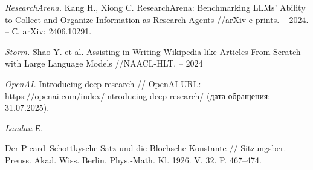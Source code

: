 \documentclass{article}
\theoremstyle{definition}
\theoremstyle{plain}
\begin{document}
\begin{thebibliography}{99}

\textit{ResearchArena.}
Kang H., Xiong C. ResearchArena: Benchmarking LLMs' Ability to Collect and Organize Information as Research Agents //arXiv e-prints. – 2024. – С. arXiv: 2406.10291.

\textit{Storm.}
Shao Y. et al. Assisting in Writing Wikipedia-like Articles From Scratch with Large Language Models //NAACL-HLT. – 2024

\textit{OpenAI.}
Introducing deep research // OpenAI URL: https://openai.com/index/introducing-deep-research/ (дата обращения: 31.07.2025).

\textit{Landau Е.}

Der Picard--Schottkysche Satz und die Blochsche Konstante //
Sitzungsber. Preuss. Akad. Wiss. Berlin, Phys.-Math. Kl. 1926. V. 32. P. 467--474.

\end{thebibliography}
\end{document}
